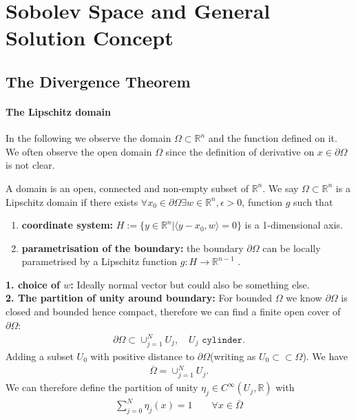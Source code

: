 \newpage
\section{Sobolev Space and General Solution Concept}
\subsection{The Divergence Theorem}
\paragraph{The Lipschitz domain}
In the following we observe the domain $\Omega \subset \mathbb{R}^n$ and the function defined on it. We often observe the open domain $\Omega$ since the definition of derivative on $x \in \partial \Omega$ is not clear. 
\begin{definition}
A domain is an open, connected and non-empty subset of $\mathbb{R}^n$. We say $\Omega \subset \mathbb{R}^n$ is a Lipschitz domain if there exists $\forall x_0 \in \partial\Omega \exists w \in \mathbb{R}^n, \epsilon > 0$, function $g$ such that
\begin{enumerate}
	\item \textbf{coordinate system:} $H:= \{ y \in \mathbb{R}^n| \langle y - x_0, w \rangle = 0\}$ is a 1-dimensional axis. 
	\item \textbf{parametrisation of the boundary:} the boundary $\partial\Omega$ can be locally parametrised by a Lipschitz function $g:H \rightarrow \mathbb{R}^{n -1}$ . 
\end{enumerate}
\end{definition}
\begin{remark}
\textbf{1. choice of $w$:} Ideally normal vector but could also be something else. \\
\textbf{2. The partition of unity around boundary:}
 For bounded $\Omega$ we know $\partial \Omega$ is closed and bounded hence compact, therefore we can find a finite open cover of $\partial\Omega$:
\begin{align*}
	\partial\Omega \subset \cup_{j = 1}^N U_j, \quad U_j \texttt{ cylinder}.
\end{align*}	
Adding a subset $U_0$ with positive distance to $\partial\Omega$(writing as $U_0 \subset  \subset \Omega$). We have 
\begin{align*}
	\overline{\Omega} = \cup_{j = 1}^N U_j.
\end{align*}
We can therefore define the partition of unity $\eta_j \in C^\infty(U_j, \mathbb{R})$ with
\begin{align*}
	\sum_{j = 0}^N \eta_j(x) = 1 \qquad \forall x \in \bar{\Omega}
\end{align*}
\end{remark}

